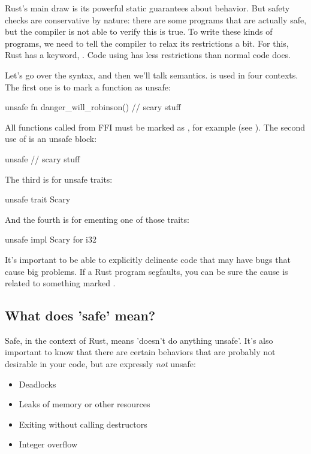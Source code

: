 Rust's main draw is its powerful static guarantees about behavior. But safety checks are conservative by nature: there are some 
programs that are actually safe, but the compiler is not able to verify this is true. To write these kinds of programs, we need to 
tell the compiler to relax its restrictions a bit. For this, Rust has a keyword, . Code using  has less 
restrictions than normal code does.

\blank

Let's go over the syntax, and then we'll talk semantics.  is used in four contexts. The first one is to mark a function 
as unsafe:

\begin{rustc}
unsafe fn danger_will_robinson() {
    // scary stuff
}
\end{rustc}

All functions called from FFI must be marked as , for example (see ). The second use 
of  is an unsafe block:

\begin{rustc}
unsafe {
    // scary stuff
}
\end{rustc}

The third is for unsafe traits:

\begin{rustc}
unsafe trait Scary { }
\end{rustc}

And the fourth is for ementing one of those traits:

\begin{rustc}
unsafe impl Scary for i32 {}
\end{rustc}

It's important to be able to explicitly delineate code that may have bugs that cause big problems. If a Rust program segfaults, you 
can be sure the cause is related to something marked .

\subsection*{What does 'safe' mean?}

Safe, in the context of Rust, means 'doesn't do anything unsafe'. It's also important to know that there are certain behaviors that 
are probably not desirable in your code, but are expressly \emph{not} unsafe:

\begin{itemize}
  \item{Deadlocks}
  \item{Leaks of memory or other resources}
  \item{Exiting without calling destructors}
  \item{Integer overflow}
\end{itemize}

